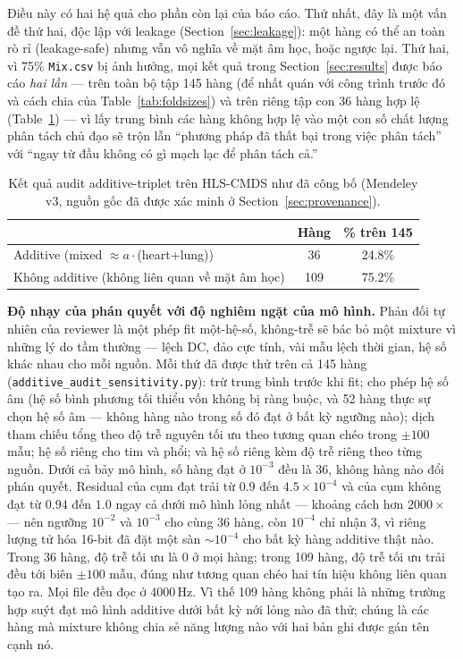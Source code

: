 \documentclass[11pt]{article}
\begin{document}
Điều này có hai hệ quả cho phần còn lại của báo cáo. Thứ nhất, đây là một
vấn đề thứ hai, độc lập với leakage (Section~\ref{sec:leakage}): một hàng
có thể an toàn rò rỉ (leakage-safe) nhưng vẫn vô nghĩa về mặt âm học, hoặc
ngược lại. Thứ hai, vì 75\% \texttt{Mix.csv} bị ảnh hưởng, mọi kết quả
trong Section~\ref{sec:results} được báo cáo \emph{hai lần} --- trên toàn
bộ tập 145 hàng (để nhất quán với công trình trước đó và cách chia của
Table~\ref{tab:foldsizes}) và trên riêng tập con 36 hàng hợp lệ
(Table~\ref{tab:additivesubset}) --- vì lấy trung bình các hàng không hợp
lệ vào một con số chất lượng phân tách chủ đạo sẽ trộn lẫn ``phương pháp
đã thất bại trong việc phân tách'' với ``ngay từ đầu không có gì mạch lạc
để phân tách cả.''

\begin{table}[H]
\centering
\caption{Kết quả audit additive-triplet trên HLS-CMDS như đã công bố
(Mendeley v3, nguồn gốc đã được xác minh ở Section~\ref{sec:provenance}).}
\label{tab:additivesubset}
\begin{tabular}{@{}lcc@{}}
\toprule
 & Hàng & \% trên 145 \\
\midrule
Additive (mixed $\approx a\cdot$(heart+lung)) & 36 & 24.8\% \\
Không additive (không liên quan về mặt âm học) & 109 & 75.2\% \\
\bottomrule
\end{tabular}
\end{table}

\textbf{Độ nhạy của phán quyết với độ nghiêm ngặt của mô hình.} Phản
đối tự nhiên của reviewer là một phép fit một-hệ-số, không-trễ sẽ bác bỏ
một mixture vì những lý do tầm thường --- lệch DC, đảo cực tính, vài mẫu
lệch thời gian, hệ số khác nhau cho mỗi nguồn. Mỗi thứ đã được thử trên
cả 145 hàng (\texttt{additive\_audit\_sensitivity.py}): trừ trung bình
trước khi fit; cho phép hệ số âm (hệ số bình phương tối thiểu vốn không
bị ràng buộc, và 52 hàng thực sự chọn hệ số âm --- không hàng nào trong
số đó đạt ở bất kỳ ngưỡng nào); dịch tham chiếu tổng theo độ trễ nguyên
tối ưu theo tương quan chéo trong $\pm100$ mẫu; hệ số riêng cho tim và
phổi; và hệ số riêng kèm độ trễ riêng theo từng nguồn. Dưới cả bảy mô
hình, số hàng đạt ở $10^{-3}$ đều là 36, không hàng nào đổi phán quyết.
Residual của cụm đạt trải từ $0.9$ đến $4.5\times10^{-4}$ và của cụm
không đạt từ $0.94$ đến $1.0$ ngay cả dưới mô hình lỏng nhất --- khoảng
cách hơn $2000\times$ --- nên ngưỡng $10^{-2}$ và $10^{-3}$ cho cùng 36
hàng, còn $10^{-4}$ chỉ nhận 3, vì riêng lượng tử hóa 16-bit đã đặt một
sàn $\sim 10^{-4}$ cho bất kỳ hàng additive thật nào. Trong 36 hàng, độ
trễ tối ưu là 0 ở mọi hàng; trong 109 hàng, độ trễ tối ưu trải đều tới
biên $\pm100$ mẫu, đúng như tương quan chéo hai tín hiệu không liên quan
tạo ra. Mọi file đều đọc ở 4000\,Hz. Vì thế 109 hàng không phải là
những trường hợp suýt đạt mô hình additive dưới bất kỳ nới lỏng nào đã
thử; chúng là các hàng mà mixture không chia sẻ năng lượng nào với hai
bản ghi được gán tên cạnh nó.
\end{document}
